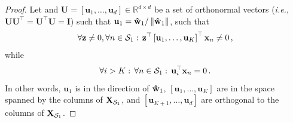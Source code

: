 \documentclass[twoside,11pt,english]{article}
\begin{document}
{\begin{proof}
Let and $\mathbf{U}=\left[\mathbf{u}_{1},\dots,\mathbf{u}_{d}\right]\in\mathbb{R}^{d\times d}$
be a set of orthonormal vectors (\emph{i.e.}, \textbf{$\mathbf{U}\mathbf{U}^{\top}=\mathbf{U}^{\top}\mathbf{U}=\mathbf{I}$})
such that $\mathbf{u}_{1}=\mathbf{\hat{\mathbf{w}}}_{1}/\left\Vert \mathbf{\hat{\mathbf{w}}}_{1}\right\Vert $,
such that 
\begin{equation}
\forall\mathbf{z}\neq0,\forall n\in\mathcal{S}_{1}:\,\mathbf{z}^{\top}\left[\mathbf{u}_{1},\dots,\mathbf{u}_{K}\right]^{\top}\mathbf{x}_{n}\neq0\,,\label{eq: v no zero eigen value}
\end{equation}
while 
\begin{equation}
\forall i>K:\,\forall n\in\mathcal{S}_{1}:\,\mathbf{u}_{i}^{\top}\mathbf{x}_{n}=0\,.\label{eq: null space}
\end{equation}
In other words, $\mathbf{u}_{1}$ is in the direction of $\mathbf{\hat{\mathbf{w}}}_{1}$,
$\left[\mathbf{u}_{1},\dots,\mathbf{u}_{K}\right]$ are in the space
spanned by the columns of $\mathbf{X}_{\mathcal{S}_{1}}$, and $\left[\mathbf{u}_{K+1},\dots,\mathbf{u}_{d}\right]$
are orthogonal to the columns of $\mathbf{X}_{\mathcal{S}_{1}}$.


\end{proof}}
\end{document}
